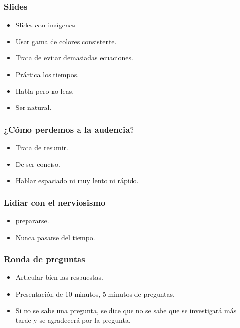 \subsubsection{Slides}
\begin{itemize}
    \item Slides con imágenes.
    \item Usar gama de colores consistente.
    \item Trata de evitar demasiadas ecuaciones.
    \item Práctica los tiempos.
    \item Habla pero no leas.
    \item Ser natural.
\end{itemize}


\subsubsection{¿Cómo perdemos a la audencia?}
\begin{itemize}
    \item Trata de resumir.
    \item De ser conciso.
    \item Hablar espaciado ni muy lento ni rápido.
\end{itemize}

\subsubsection{Lidiar con el nerviosismo}
\begin{itemize}
    \item prepararse.
    \item Nunca pasarse del tiempo.
\end{itemize}


\subsubsection{Ronda de preguntas}
\begin{itemize}
    \item Articular bien las respuestas.
    \item Presentación de 10 minutos, 5 minutos de preguntas.
    \item Si no se sabe una pregunta, se dice que no se sabe que se investigará más tarde y se agradecerá por la pregunta.
\end{itemize}




